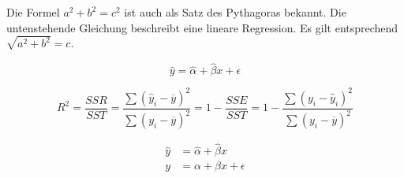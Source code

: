 \documentclass{article}
\begin{document}

Die Formel \(a^2+b^2=c^2\) ist auch als Satz des Pythagoras bekannt. Die untenstehende Gleichung beschreibt eine lineare Regression. Es gilt entsprechend $\sqrt{a^2+b^2}=c$.

\begin{equation}
  \hat{y} = \hat{\alpha}+\hat{\beta}x + \epsilon
\end{equation}

\begin{equation}
  \mathit{R}^2=\frac{SSR}{SST}=
  \frac{\sum\nolimits \left(\hat{y}_i-\overline{y}\right)^2}{\sum\nolimits\left(y_i-\overline{y}\right)^2}=1-\frac{SSE}{SST}=1-\frac{\sum\nolimits\left(y_i-\hat{y}_i\right)^2}{\sum\nolimits \left(y_i-\overline{y}\right)^2}
\end{equation}

\vspace{1em}
\lipsum[1]

\begin{align}
  \hat{y} & = \hat{\alpha}+\hat{\beta}x \\
  y       & = \alpha+\beta x+\epsilon
\end{align}
\end{document}
